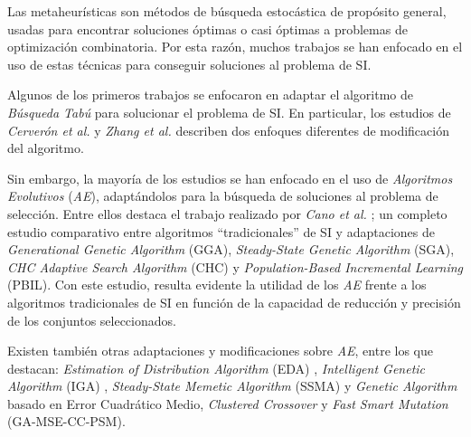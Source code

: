Las metaheurísticas son métodos de búsqueda estocástica de propósito general, usadas para encontrar soluciones óptimas o casi óptimas a problemas de optimización combinatoria. Por esta razón, muchos trabajos se han enfocado en el uso de estas técnicas para conseguir soluciones al problema de SI.

Algunos de los primeros trabajos se enfocaron en adaptar el algoritmo de \emph{Búsqueda Tabú} para solucionar el problema de SI. En particular, los estudios de \emph{Cerverón et al.} \cite{cerveron2001another} y \emph{Zhang et al.} \cite{zhang2002optimal} describen dos enfoques diferentes de modificación del algoritmo.

Sin embargo, la mayoría de los estudios se han enfocado en el uso de \emph{Algoritmos Evolutivos} (\emph{AE}), adaptándolos para la búsqueda de soluciones al problema de selección. Entre ellos destaca el trabajo realizado por \emph{Cano et al.} \cite{cano2003using}; un completo estudio comparativo entre algoritmos ``tradicionales'' de SI y adaptaciones de \emph{Generational Genetic Algorithm} (GGA), \emph{Steady-State Genetic Algorithm} (SGA), \emph{CHC Adaptive Search Algorithm} (CHC) y \emph{Population-Based Incremental Learning} (PBIL). Con este estudio, resulta evidente la utilidad de los \emph{AE} frente a los algoritmos tradicionales de SI en función de la capacidad de reducción y precisión de los conjuntos seleccionados.

Existen también otras adaptaciones y modificaciones sobre \emph{AE}, entre los que destacan: \emph{Estimation of Distribution Algorithm} (EDA) \cite{sierra2001prototype}, \emph{Intelligent Genetic Algorithm} (IGA) \cite{ho2002design}, \emph{Steady-State Memetic Algorithm} (SSMA) \cite{garcia2008memetic} y \emph{Genetic Algorithm} \cite{gil2008evolving} basado en Error Cuadrático Medio, \emph{Clustered Crossover} y \emph{Fast Smart Mutation} (GA-MSE-CC-PSM).

